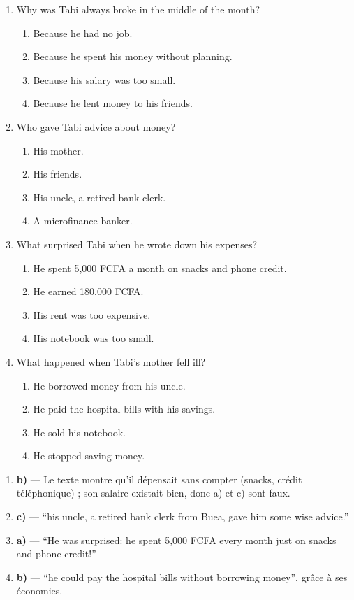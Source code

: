 \documentclass[11pt]{article}
\begin{document}
\begin{exercice}
\begin{enumerate}
\item Why was Tabi always broke in the middle of the month?
\begin{enumerate}
\item[a)] Because he had no job.
\item[b)] Because he spent his money without planning.
\item[c)] Because his salary was too small.
\item[d)] Because he lent money to his friends.
\end{enumerate}
\item Who gave Tabi advice about money?
\begin{enumerate}
\item[a)] His mother.
\item[b)] His friends.
\item[c)] His uncle, a retired bank clerk.
\item[d)] A microfinance banker.
\end{enumerate}
\item What surprised Tabi when he wrote down his expenses?
\begin{enumerate}
\item[a)] He spent 5,000 FCFA a month on snacks and phone credit.
\item[b)] He earned 180,000 FCFA.
\item[c)] His rent was too expensive.
\item[d)] His notebook was too small.
\end{enumerate}
\item What happened when Tabi's mother fell ill?
\begin{enumerate}
\item[a)] He borrowed money from his uncle.
\item[b)] He paid the hospital bills with his savings.
\item[c)] He sold his notebook.
\item[d)] He stopped saving money.
\end{enumerate}
\end{enumerate}
\end{exercice}

\begin{corrige}
\begin{enumerate}
\item \textbf{b)} — Le texte montre qu'il dépensait sans compter (snacks, crédit téléphonique) ; son salaire existait bien, donc a) et c) sont faux.
\item \textbf{c)} — “his uncle, a retired bank clerk from Buea, gave him some wise advice.”
\item \textbf{a)} — “He was surprised: he spent 5,000 FCFA every month just on snacks and phone credit!”
\item \textbf{b)} — “he could pay the hospital bills without borrowing money”, grâce à ses économies.
\end{enumerate}
\end{corrige}
\end{document}
